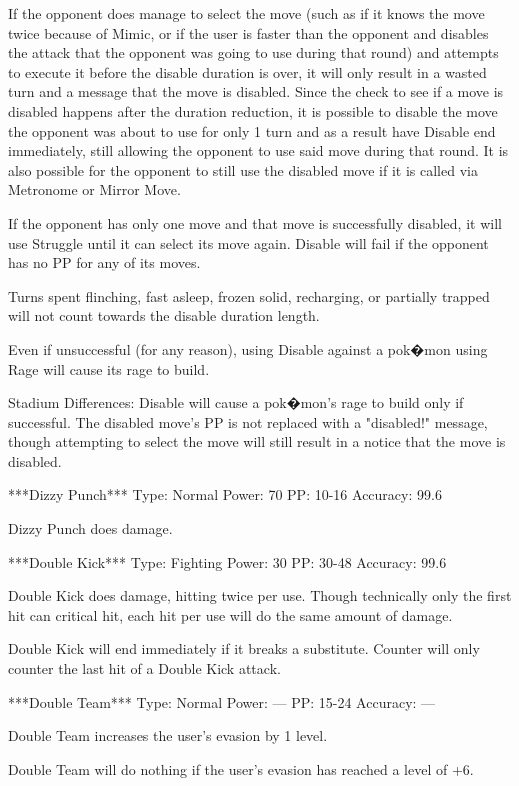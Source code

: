 \documentclass[reprint, aps, prl, paper=A4]{revtex4-1}
\begin{document}
If the opponent does manage to select the move (such as if it knows the move twice because of
Mimic, or if the user is faster than the opponent and disables the attack that the opponent was
going to use during that round) and attempts to execute it before the disable duration is over,
it will only result in a wasted turn and a message that the move is disabled. Since the check
to see if a move is disabled happens after the duration reduction, it is possible to disable
the move the opponent was about to use for only 1 turn and as a result have Disable end
immediately, still allowing the opponent to use said move during that round. It is also
possible for the opponent to still use the disabled move if it is called via Metronome or
Mirror Move.

If the opponent has only one move and that move is successfully disabled, it will use Struggle
until it can select its move again. Disable will fail if the opponent has no PP for any of its
moves.

Turns spent flinching, fast asleep, frozen solid, recharging, or partially trapped will not
count towards the disable duration length.

Even if unsuccessful (for any reason), using Disable against a pok�mon using Rage will cause
its rage to build.

Stadium Differences:
Disable will cause a pok�mon's rage to build only if successful. The disabled move's PP is not
replaced with a "disabled!" message, though attempting to select the move will still result in
a notice that the move is disabled.


***Dizzy Punch***
Type: Normal
Power: 70
PP: 10-16
Accuracy: 99.6%

Dizzy Punch does damage.


***Double Kick***
Type: Fighting
Power: 30
PP: 30-48
Accuracy: 99.6%

Double Kick does damage, hitting twice per use. Though technically only the first hit can
critical hit, each hit per use will do the same amount of damage.

Double Kick will end immediately if it breaks a substitute. Counter will only counter the last
hit of a Double Kick attack.


***Double Team***
Type: Normal
Power: ---
PP: 15-24
Accuracy: ---

Double Team increases the user's evasion by 1 level.

Double Team will do nothing if the user's evasion has reached a level of +6.
\end{document}

